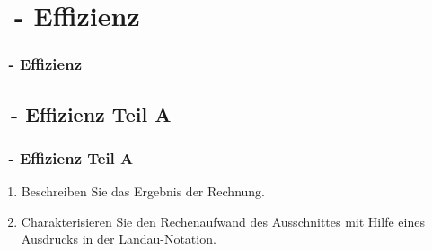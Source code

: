 \def\stitle{\theexercise\ - Effizienz}
\def\sAtitle{\theexercise\ - Effizienz Teil A}
\def\sBtitle{\theexercise\ - Effizienz Teil B}

\section{\stitle}
\begin{frame}
  \frametitle{\stitle}%
\tableofcontents[current]
\end{frame}

\subsection{\sAtitle}
\begin{frame}%
  \frametitle{\sAtitle}%

\begin{enumerate}
\item Beschreiben Sie das Ergebnis der Rechnung.
\item Charakterisieren Sie den Rechenaufwand des Ausschnittes mit Hilfe eines Ausdrucks in der Landau-Notation.
\end{enumerate}


\end{frame}


